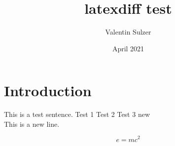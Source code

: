 \documentclass{article}
\title{latexdiff test}
\author{Valentin Sulzer}
\date{April 2021}
\begin{document}
\maketitle

\section{Introduction}

This is a test sentence.
Test 1
Test 2
Test 3
new
\\This is a new line.

\begin{equation}
    e = mc^2
\end{equation}
\end{document}
